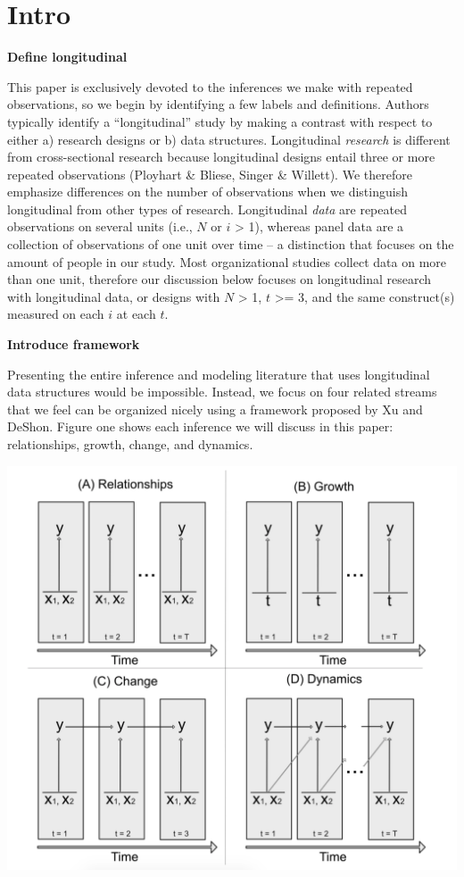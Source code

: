 \documentclass[english,,man]{apa6}
\theoremstyle{definition}
\theoremstyle{definition}
\theoremstyle{definition}
\theoremstyle{remark}
\begin{document}
\hypertarget{intro}{%
\section{Intro}\label{intro}}

\textbf{Define longitudinal}

This paper is exclusively devoted to the inferences we make with
repeated observations, so we begin by identifying a few labels and
definitions. Authors typically identify a \enquote{longitudinal} study
by making a contrast with respect to either a) research designs or b)
data structures. Longitudinal \emph{research} is different from
cross-sectional research because longitudinal designs entail three or
more repeated observations (Ployhart \& Bliese, Singer \& Willett). We
therefore emphasize differences on the number of observations when we
distinguish longitudinal from other types of research. Longitudinal
\emph{data} are repeated observations on several units (i.e., \(N\) or
\(i\) \textgreater{} 1), whereas panel data are a collection of
observations of one unit over time -- a distinction that focuses on the
amount of people in our study. Most organizational studies collect data
on more than one unit, therefore our discussion below focuses on
longitudinal research with longitudinal data, or designs with \(N\)
\textgreater{} 1, \(t\) \textgreater{}= 3, and the same construct(s)
measured on each \(i\) at each \(t\).

\textbf{Introduce framework}

Presenting the entire inference and modeling literature that uses
longitudinal data structures would be impossible. Instead, we focus on
four related streams that we feel can be organized nicely using a
framework proposed by Xu and DeShon. Figure one shows each inference we
will discuss in this paper: relationships, growth, change, and dynamics.

\includegraphics{figures/common_models.png}
\end{document}
